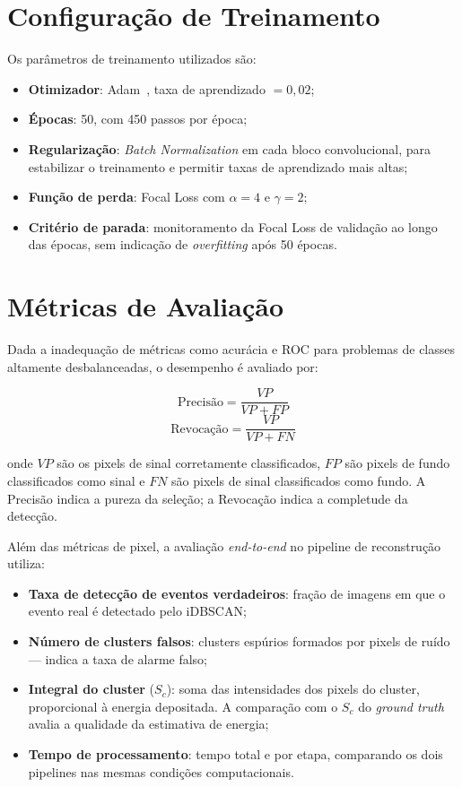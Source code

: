 \documentclass[
       oneside,
       english,
       brazil
       ]{abntbibufjf}
\begin{document}
\section{Configuração de Treinamento}
\label{sec:training_config}

Os parâmetros de treinamento utilizados são:
\begin{itemize}
    \item \textbf{Otimizador}: Adam~\cite{defossez2020convergence}, taxa de
    aprendizado $= 0{,}02$;
    \item \textbf{Épocas}: 50, com 450 passos por época;
    \item \textbf{Regularização}: \textit{Batch Normalization} em cada bloco
    convolucional, para estabilizar o treinamento e permitir taxas de
    aprendizado mais altas;
    \item \textbf{Função de perda}: Focal Loss com $\alpha = 4$ e
    $\gamma = 2$;
    \item \textbf{Critério de parada}: monitoramento da Focal Loss de
    validação ao longo das épocas, sem indicação de \textit{overfitting}
    após 50 épocas.
\end{itemize}

\section{Métricas de Avaliação}
\label{sec:metrics}

Dada a inadequação de métricas como acurácia e ROC para problemas de classes
altamente desbalanceadas, o desempenho é avaliado por:

\begin{equation}
    \text{Precisão} = \frac{VP}{VP + FP}
    \label{eq:precision}
\end{equation}
\begin{equation}
    \text{Revocação} = \frac{VP}{VP + FN}
    \label{eq:recall}
\end{equation}

onde $VP$ são os pixels de sinal corretamente classificados, $FP$ são pixels
de fundo classificados como sinal e $FN$ são pixels de sinal classificados
como fundo. A Precisão indica a pureza da seleção; a Revocação indica a
completude da detecção.

Além das métricas de pixel, a avaliação \textit{end-to-end} no pipeline de
reconstrução utiliza:
\begin{itemize}
    \item \textbf{Taxa de detecção de eventos verdadeiros}: fração de imagens
    em que o evento real é detectado pelo iDBSCAN;
    \item \textbf{Número de clusters falsos}: clusters espúrios formados por
    pixels de ruído — indica a taxa de alarme falso;
    \item \textbf{Integral do cluster} ($S_c$): soma das intensidades dos
    pixels do cluster, proporcional à energia depositada. A comparação com o
    $S_c$ do \textit{ground truth} avalia a qualidade da estimativa de
    energia;
    \item \textbf{Tempo de processamento}: tempo total e por etapa,
    comparando os dois pipelines nas mesmas condições computacionais.
\end{itemize}
\end{document}
